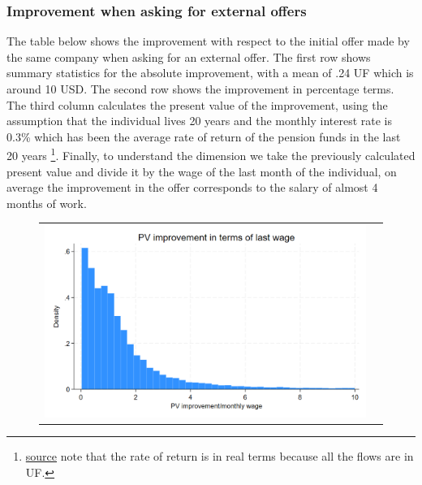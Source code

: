 \documentclass[12pt]{article}
\begin{document}



\subsubsection{Improvement when asking for external offers}

The table below shows the improvement with respect to the initial offer made by the same company when asking for an external offer. The first row shows summary statistics for the absolute improvement, with a mean of .24 UF which is around 10 USD. The second row shows the improvement in percentage terms. The third column calculates the present value of the improvement, using the assumption that the individual lives 20 years and the monthly interest rate is 0.3\% which has been the average rate of return of the pension funds in the last 20 years \footnote{\href{https://bigdatauls.userena.cl/dashboards/rentabilidad-fondo-de-pensiones/}{source} note that the rate of return is in real terms because all the flows are in UF.}. Finally, to understand the dimension we take the previously calculated present value and divide it by the wage of the last month of the individual, on average the improvement in the offer corresponds to the salary of almost 4 months of work.  



\begin{figure}[H]
\caption{}
\label{fig:aux}
\centering{}%
\begin{tabular}{cc}
\includegraphics[scale=0.3]{../figures/IE3_offer_improvement_histogram.png}
\end{tabular}
\end{figure}
\end{document}
